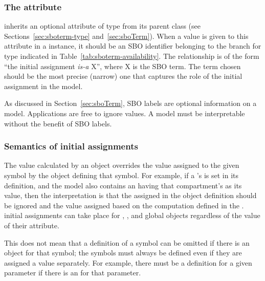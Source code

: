 \subsubsection{The  attribute}
\label{sec:initialassignment-sboterm}

\InitialAssignment inherits an optional 
attribute of type  from its parent
class \SBase (see Sections~\ref{sec:sboterm-type}
and~\ref{sec:sboTerm}).  When a value is given to this
attribute in a \InitialAssignment instance, it should be an
SBO identifier belonging to the branch for type \InitialAssignment  
indicated in Table~\ref{tab:sboterm-availability}.  The relationship is
of the form ``the initial assignment \emph{is-a} X'', where X is
the SBO term.  The term chosen should be the most precise (narrow)
one that captures the role of the initial assignment in the model.

As discussed in Section~\ref{sec:sboTerm}, SBO labels are optional
information on a model.  Applications are free to ignore
 values.  A model must be interpretable without the
benefit of SBO labels.


\subsubsection{Semantics of initial assignments}
\label{sec:initial-assignment-semantics}

The value calculated by an \InitialAssignment object overrides the
value assigned to the given symbol by the object defining that
symbol.  For example, if a \Compartment's  is set in
its definition, and the model also contains an \InitialAssignment
having that compartment's  as its  value,
then the interpretation is that the  assigned in the
\Compartment object definition should be ignored and the value
assigned based on the computation defined in the
\InitialAssignment.   initial assignments can take place for
\Compartment, \Species, \SpeciesReference and global \Parameter
objects regardless of the value of their 
attribute.

This does not mean that a definition of a symbol can be omitted if
there is an \InitialAssignment object for that symbol; the symbols
must always be defined even if they are assigned a value
separately.  For example, there must be a \Parameter definition
for a given parameter if there is an \InitialAssignment for that
parameter.

